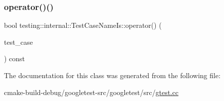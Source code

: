 \subsubsection{\texorpdfstring{operator()()}{operator()()}}
{\footnotesize\ttfamily bool testing\+::internal\+::\+Test\+Case\+Name\+Is\+::operator() (\begin{DoxyParamCaption}\item[{const \mbox{\hyperlink{classtesting_1_1TestCase}{Test\+Case}} $\ast$}]{test\+\_\+case }\end{DoxyParamCaption}) const\hspace{0.3cm}{\ttfamily [inline]}}



The documentation for this class was generated from the following file\+:\begin{DoxyCompactItemize}
\item 
cmake-\/build-\/debug/googletest-\/src/googletest/src/\mbox{\hyperlink{gtest_8cc}{gtest.\+cc}}\end{DoxyCompactItemize}
